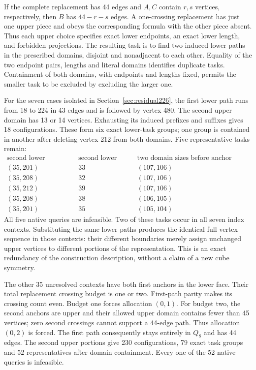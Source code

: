 \documentclass[11pt,a4paper]{article}
\theoremstyle{definition}
\theoremstyle{remark}
\begin{document}
If the complete replacement has 44 edges and $A,C$ contain $r,s$
vertices, respectively, then $B$ has $44-r-s$ edges. A one-crossing
replacement has just one upper piece and obeys the corresponding formula
with the other piece absent. Thus each upper choice specifies exact
lower endpoints, an exact lower length, and forbidden projections.
The resulting task is to find two induced lower paths in the prescribed
domains, disjoint and nonadjacent to each other. Equality of the two
endpoint pairs, lengths and literal domains identifies duplicate tasks.
Containment of both domains, with endpoints and lengths fixed, permits
the smaller task to be excluded by excluding the larger one.

For the seven cases isolated in Section~\ref{sec:residual226}, the first
lower path runs from 18 to 224 in 43 edges and is followed by vertex 480.
The second upper domain has 13 or 14 vertices. Exhausting its induced
prefixes and suffixes gives 18 configurations. These form six exact
lower-task groups; one group is contained in another after deleting
vertex 212 from both domains. Five representative tasks remain:
\[
\begin{array}{c|c|c}
\text{second lower endpoints}&\text{second lower edges}&
\text{two domain sizes before anchor pruning}\\\hline
(35,201)&33&(107,106)\\
(35,208)&32&(107,106)\\
(35,212)&39&(107,106)\\
(35,208)&38&(106,105)\\
(35,201)&35&(105,104)
\end{array}
\]
All five native queries are infeasible. Two of these tasks occur in
all seven index contexts. Substituting the same lower paths produces
the identical full vertex sequence in those contexts: their different
boundaries merely assign unchanged upper vertices to different portions
of the representation. This is an exact redundancy of the construction
description, without a claim of a new cube symmetry.

The other 35 unresolved contexts have both first anchors in the lower
face. Their total replacement crossing budget is one or two. First-path
parity makes its crossing count even. Budget one forces allocation
$(0,1)$. For budget two, the second anchors are upper and their allowed
upper domain contains fewer than 45 vertices; zero second crossings
cannot support a 44-edge path. Thus allocation $(0,2)$ is forced.
The first path consequently stays entirely in $Q_8$ and has 44 edges.
The second upper portions give 230 configurations, 79 exact task groups
and 52 representatives after domain containment. Every one of the 52
native queries is infeasible.
\end{document}
